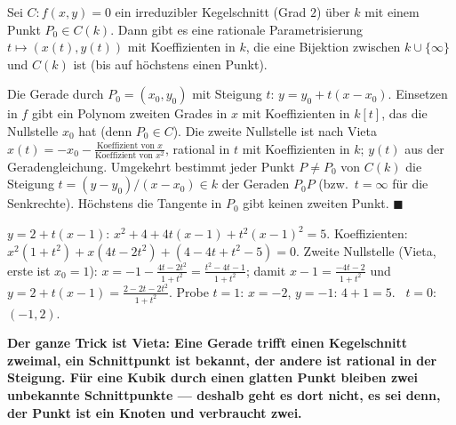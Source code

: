 \begin{merksatz}
Sei $C\colon f(x, y) = 0$ ein irreduzibler Kegelschnitt (Grad $2$) über $k$ mit einem Punkt $P_0\in C(k)$. Dann gibt es eine rationale Parametrisierung $t\mapsto(x(t), y(t))$ mit Koeffizienten in $k$, die eine Bijektion zwischen $k\cup\{\infty\}$ und $C(k)$ ist (bis auf höchstens einen Punkt).

Die Gerade durch $P_0 = (x_0, y_0)$ mit Steigung $t$: $y = y_0 + t(x - x_0)$. Einsetzen in $f$ gibt ein Polynom zweiten Grades in $x$ mit Koeffizienten in $k[t]$, das die Nullstelle $x_0$ hat (denn $P_0\in C$). Die zweite Nullstelle ist nach Vieta $x(t) = -x_0 - \frac{\text{Koeffizient von } x}{\text{Koeffizient von } x^{2}}$, rational in $t$ mit Koeffizienten in $k$; $y(t)$ aus der Geradengleichung. Umgekehrt bestimmt jeder Punkt $P\ne P_0$ von $C(k)$ die Steigung $t = (y - y_0)/(x - x_0)\in k$ der Geraden $P_0P$ (bzw.\ $t = \infty$ für die Senkrechte). Höchstens die Tangente in $P_0$ gibt keinen zweiten Punkt. $\blacksquare$

$y = 2 + t(x - 1)$: $x^{2} + 4 + 4t(x - 1) + t^{2}(x - 1)^{2} = 5$. Koeffizienten: $x^{2}(1 + t^{2}) + x(4t - 2t^{2}) + (4 - 4t + t^{2} - 5) = 0$. Zweite Nullstelle (Vieta, erste ist $x_0 = 1$): $x = -1 - \frac{4t - 2t^{2}}{1 + t^{2}} = \frac{t^{2} - 4t - 1}{1 + t^{2}}$; damit $x - 1 = \frac{-4t - 2}{1 + t^{2}}$ und $y = 2 + t(x - 1) = \frac{2 - 2t - 2t^{2}}{1 + t^{2}}$. Probe $t = 1$: $x = -2$, $y = -1$: $4 + 1 = 5$. \checkmark\ $t = 0$: $(-1, 2)$. \checkmark

\begin{center}
\begin{minipage}{0.9\textwidth}
\textbf{Der ganze Trick ist Vieta: Eine Gerade trifft einen Kegelschnitt zweimal, ein Schnittpunkt ist bekannt, der andere ist rational in der Steigung. Für eine Kubik durch einen glatten Punkt bleiben zwei unbekannte Schnittpunkte --- deshalb geht es dort nicht, es sei denn, der Punkt ist ein Knoten und verbraucht zwei.}
\end{minipage}
\end{center}


\end{merksatz}
